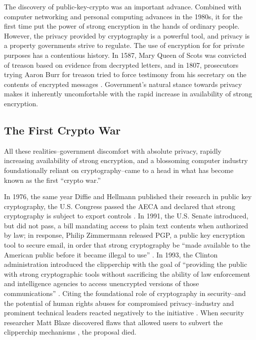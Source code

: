 The discovery of \ac{public-key-crypto} was an important advance. Combined with computer networking and personal
computing advances in the 1980s, it for the first time put the power of strong encryption in the hands of ordinary
people. However, the privacy provided by cryptography is a powerful tool, and privacy is a property governments strive
to regulate. The use of encryption for for private purposes has a contentious history. In 1587, Mary Queen of Scots was
convicted of treason based on evidence from decrypted letters, and in 1807, prosecutors trying Aaron Burr for treason
tried to force testimony from his secretary on the contents of encrypted messages \cite{kerr_encryption_2017}.
Government's natural stance towards privacy makes it inherently uncomfortable with the rapid increase in availability of
strong encryption.


\subsection{The First Crypto War}
\label{sec-history-cw1}

All these realities--government discomfort with absolute privacy, rapidly increasing availability of strong encryption,
and a blossoming computer industry foundationally reliant on cryptography--came to a head in what has become known as
the first ``crypto war.''

In 1976, the same year Diffie and Hellmann published their research in public key cryptography, the U.S. Congress passed
the \ac{AECA} and declared that strong cryptography is subject to export controls \cite{kehl_right_2015}. In 1991, the
U.S. Senate introduced, but did not pass, a bill mandating access to plain text contents when authorized by law; in
response, Philip Zimmermann released \ac{PGP}, a public key encryption tool to secure email, in order that strong
cryptography be ``made available to the American public before it became illegal to use'' \cite{zimmermann_1996}. In
1993, the Clinton administration introduced the \ac{clipperchip} \cite{press_1993} with the goal of ``providing the
public with strong cryptographic tools without sacrificing the ability of law enforcement and intelligence agencies to
access unencrypted versions of those communications'' \cite{thompson_2015}. Citing the foundational role of cryptography
in security--and the potential of human rights abuses for compromised privacy--industry and prominent technical leaders
reacted negatively to the initiative \cite{kehl_right_2015} \cite{zimmermann_1996}. When security researcher Matt Blaze
discovered flaws that allowed users to subvert the \ac{clipperchip} mechanisms \cite{blaze_protocol_1994}, the proposal
died.

